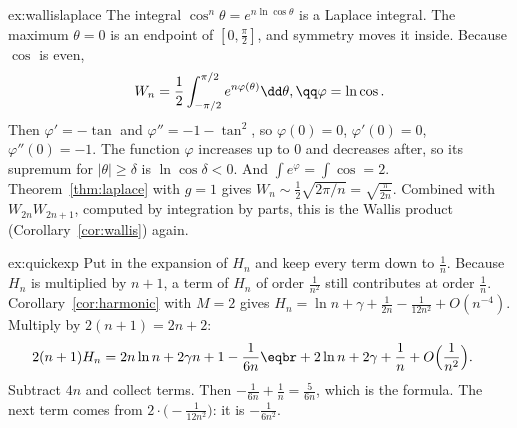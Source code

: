 \begin{solution}{ex:wallislaplace}
\idea The integral $\cos^n\theta=e^{n\ln\cos\theta}$ is a Laplace integral. The maximum $\theta=0$ is an endpoint of $[0,\frac\pi2]$, and symmetry moves it inside.
\writeup Because $\cos$ is even,
\[
\begin{gathered}W_n=\frac12\int_{-\pi/2}^{\pi/2}e^{n\varphi(\theta)}\dd\theta,\qq\varphi=\ln\cos.\end{gathered}
\]
Then $\varphi'=-\tan$ and $\varphi''=-1-\tan^2$, so $\varphi(0)=0$, $\varphi'(0)=0$, $\varphi''(0)=-1$. The function $\varphi$ increases up to $0$ and decreases after, so its supremum for $|\theta|\ge\delta$ is $\ln\cos\delta<0$. And $\int e^\varphi=\int\cos=2$. Theorem~\ref{thm:laplace} with $g=1$ gives $W_n\sim\frac12\sqrt{2\pi/n}=\sqrt{\frac\pi{2n}}$. Combined with $W_{2n}W_{2n+1}$, computed by integration by parts, this is the Wallis product (Corollary~\ref{cor:wallis}) again.
\end{solution}

\begin{solution}{ex:quickexp}
\idea Put in the expansion of $H_n$ and keep every term down to $\frac1n$. Because $H_n$ is multiplied by $n+1$, a term of $H_n$ of order $\frac1{n^2}$ still contributes at order $\frac1n$.
\writeup Corollary~\ref{cor:harmonic} with $M=2$ gives $H_n=\ln n+\gamma+\frac1{2n}-\frac1{12n^2}+O(n^{-4})$. Multiply by $2(n+1)=2n+2$:
\[
\begin{aligned}2(n+1)H_n&=2n\ln n+2\gamma n+1-\frac1{6n}\eqbr+2\ln n+2\gamma+\frac1n+O\Bigl(\frac1{n^2}\Bigr).\end{aligned}
\]
Subtract $4n$ and collect terms. Then $-\frac1{6n}+\frac1n=\frac5{6n}$, which is the formula. The next term comes from $2\cdot\bigl(-\frac1{12n^2}\bigr)$: it is $-\frac1{6n^2}$.
\end{solution}

